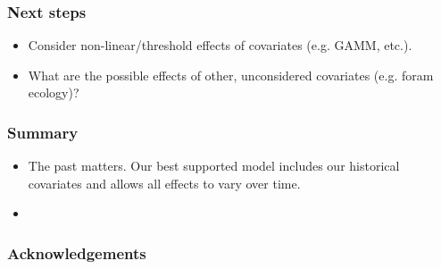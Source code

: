 \documentclass{beamer}
\begin{document}
\begin{frame}
  \frametitle{Next steps}

  \begin{itemize}
    \item Consider non-linear/threshold effects of covariates (e.g. GAMM, etc.).
    \item What are the possible effects of other, unconsidered covariates (e.g. foram ecology)?
  \end{itemize}

\end{frame}


\begin{frame}
  \frametitle{Summary}

  \begin{itemize}
    \item \alert{The past matters.} Our best supported model includes our historical covariates and allows all effects to vary over time.
    \item 
  \end{itemize}

\end{frame}



\begin{frame}
  \frametitle{Acknowledgements}

\end{frame}
\end{document}

